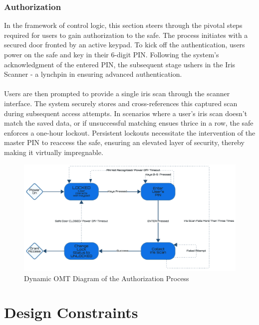 \documentclass{article}
\begin{document}
\subsubsection{Authorization}
In the framework of control logic, this section steers through the pivotal steps required for users to gain authorization to the safe. The process initiates with a secured door fronted by an active keypad. To kick off the authentication, users power on the safe and key in their 6-digit PIN. Following the system's acknowledgment of the entered PIN, the subsequent stage ushers in the Iris Scanner - a lynchpin in ensuring advanced authentication. \\ \\
Users are then prompted to provide a single iris scan through the scanner interface. The system securely stores and cross-references this captured scan during subsequent access attempts. In scenarios where a user's iris scan doesn't match the saved data, or if unsuccessful matching ensues thrice in a row, the safe enforces a one-hour lockout. Persistent lockouts necessitate the intervention of the master PIN to reaccess the safe, ensuring an elevated layer of security, thereby making it virtually impregnable.

\begin{figure}[h]
    \centering
    \includegraphics[scale=0.28]{docs/figs/authorization_process.png}
    \caption{Dynamic OMT Diagram of the Authorization Process \cite{lucidLucidVisual}}
    \label{fig:diagram4}
\end{figure}

\newpage

\section{Design Constraints}
\end{document}
